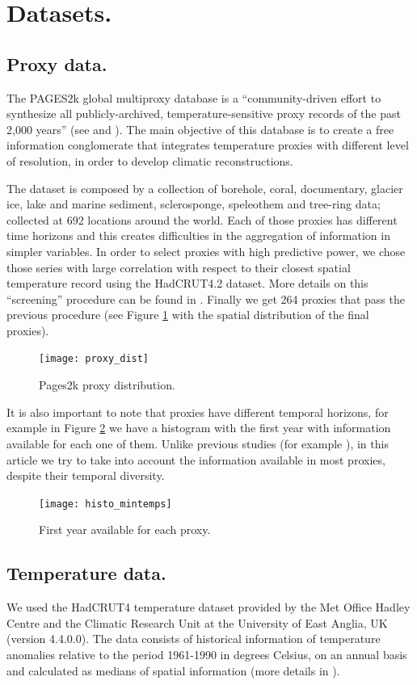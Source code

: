 \documentclass[11pt]{amsart}
\theoremstyle{plain}
\theoremstyle{definition}
\theoremstyle{remark}
\begin{document}
\section{Datasets.}
\label{sec:data}

\subsection{Proxy data.}
The PAGES2k global multiproxy database is a ``community-driven effort to
synthesize all publicly-archived, temperature-sensitive proxy records of the
past 2,000 years'' (see \cite{Kaufman2014} and \cite{PAGES2KConsortium2013}). The main objective of this database is
to create a free information conglomerate that integrates temperature proxies
with different level of resolution, in order to develop climatic
reconstructions.

The dataset is composed by a collection of borehole, coral, documentary, glacier
ice, lake and marine 
sediment, sclerosponge, speleothem and tree-ring data; collected at 692
locations around the world. Each of those proxies
has different time horizons and this creates difficulties in the aggregation of
information in simpler variables.  In order to select proxies with high
predictive power, we chose those series with large correlation with respect to
their closest spatial temperature record using the HadCRUT4.2 dataset. More
details on this ``screening'' procedure can be found in \cite{Emile-Geay2015}. Finally we get 264 proxies
that pass the previous procedure (see Figure \ref{fig:proxy} with the spatial
distribution of the final proxies).   
\begin{figure}
  \centering
  \texttt{[image: proxy\_dist]}
  \caption{Pages2k proxy distribution.}
  \label{fig:proxy}
\end{figure}
It is also important to note that proxies have different temporal horizons, for example in Figure \ref{fig:histofirstyear} we have a histogram with the first year with information available for each one of them. Unlike previous studies (for example \cite{Barboza2014}), in this article we try to take into account the information available in most proxies, despite their temporal diversity.
\begin{figure}
  \centering
  \texttt{[image: histo\_mintemps]}
  \caption{First year available for each proxy.}
  \label{fig:histofirstyear}
\end{figure}

\subsection{Temperature data.}
We used the HadCRUT4 temperature dataset provided by the Met Office Hadley
Centre and the Climatic Research Unit at the University of East Anglia, UK (version 4.4.0.0). The
data consists of historical information of temperature anomalies relative to the
period 1961-1990 in degrees Celsius, on an annual basis and calculated as
medians of spatial information (more details in \cite{Morice2012}).
\end{document}
